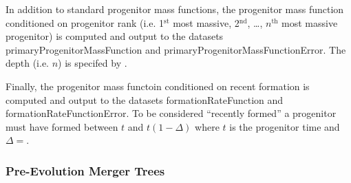 In addition to standard progenitor mass functions, the progenitor mass function conditioned on progenitor rank (i.e. 1$^\mathrm{st}$ most massive, 2$^\mathrm{nd}$, \ldots, $n^\mathrm{th}$ most massive progenitor) is computed and output to the datasets {\normalfont \ttfamily primaryProgenitorMassFunction} and {\normalfont \ttfamily primaryProgenitorMassFunctionError}. The depth (i.e. $n$) is specifed by {\normalfont \ttfamily [mergerTreeComputeConditionalMassFunctionPrimaryProgenitorDepth]}.

Finally, the progenitor mass functoin conditioned on recent formation is computed and output to the datasets {\normalfont \ttfamily formationRateFunction} and {\normalfont \ttfamily formationRateFunctionError}. To be considered ``recently formed'' a progenitor must have formed between $t$ and $t(1-\Delta)$ where $t$ is the progenitor time and $\Delta=${\normalfont \ttfamily [mergerTreeConditionalMassFunctionFormationRateTimeFraction]}.

\subsubsection{Pre-Evolution Merger Trees}

